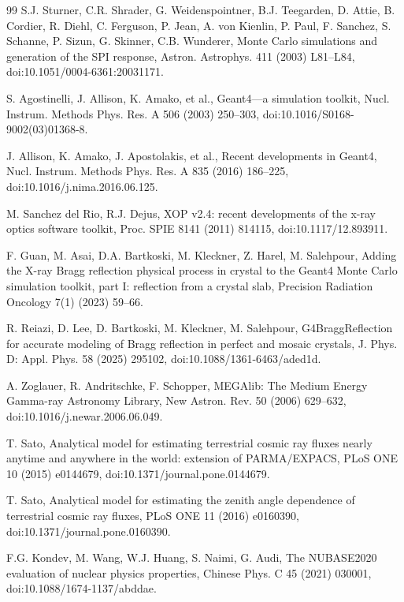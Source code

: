 \documentclass[11pt]{article}
\begin{document}
\begin{thebibliography}{99}
S.J. Sturner, C.R. Shrader, G. Weidenspointner, B.J. Teegarden, D. Attie, B. Cordier, R. Diehl, C. Ferguson, P. Jean, A. von Kienlin, P. Paul, F. Sanchez, S. Schanne, P. Sizun, G. Skinner, C.B. Wunderer, Monte Carlo simulations and generation of the SPI response, Astron. Astrophys. 411 (2003) L81--L84, doi:10.1051/0004-6361:20031171.

S. Agostinelli, J. Allison, K. Amako, et al., Geant4---a simulation toolkit, Nucl. Instrum. Methods Phys. Res. A 506 (2003) 250--303, doi:10.1016/S0168-9002(03)01368-8.

J. Allison, K. Amako, J. Apostolakis, et al., Recent developments in Geant4, Nucl. Instrum. Methods Phys. Res. A 835 (2016) 186--225, doi:10.1016/j.nima.2016.06.125.

M. Sanchez del Rio, R.J. Dejus, XOP v2.4: recent developments of the x-ray optics software toolkit, Proc. SPIE 8141 (2011) 814115, doi:10.1117/12.893911.

F. Guan, M. Asai, D.A. Bartkoski, M. Kleckner, Z. Harel, M. Salehpour, Adding the X-ray Bragg reflection physical process in crystal to the Geant4 Monte Carlo simulation toolkit, part I: reflection from a crystal slab, Precision Radiation Oncology 7(1) (2023) 59--66.

R. Reiazi, D. Lee, D. Bartkoski, M. Kleckner, M. Salehpour, G4BraggReflection for accurate modeling of Bragg reflection in perfect and mosaic crystals, J. Phys. D: Appl. Phys. 58 (2025) 295102, doi:10.1088/1361-6463/aded1d.

A. Zoglauer, R. Andritschke, F. Schopper, MEGAlib: The Medium Energy Gamma-ray Astronomy Library, New Astron. Rev. 50 (2006) 629--632, doi:10.1016/j.newar.2006.06.049.

T. Sato, Analytical model for estimating terrestrial cosmic ray fluxes nearly anytime and anywhere in the world: extension of PARMA/EXPACS, PLoS ONE 10 (2015) e0144679, doi:10.1371/journal.pone.0144679.

T. Sato, Analytical model for estimating the zenith angle dependence of terrestrial cosmic ray fluxes, PLoS ONE 11 (2016) e0160390, doi:10.1371/journal.pone.0160390.

F.G. Kondev, M. Wang, W.J. Huang, S. Naimi, G. Audi, The NUBASE2020 evaluation of nuclear physics properties, Chinese Phys. C 45 (2021) 030001, doi:10.1088/1674-1137/abddae.


\end{thebibliography}
\end{document}

